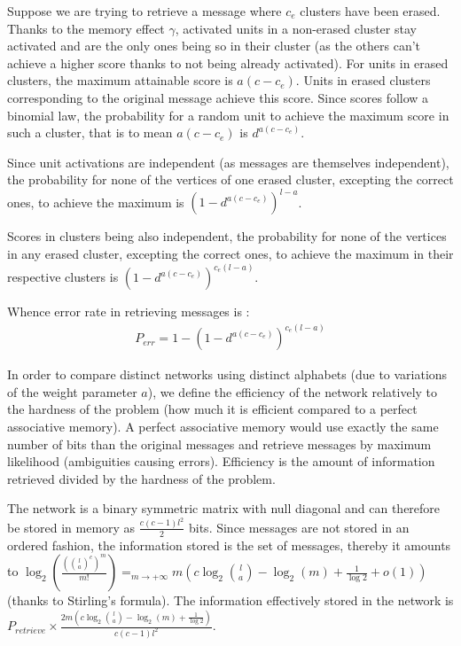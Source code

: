 \documentclass[english,10pt,twocolumn]{IEEEtran}
\theoremstyle{definition}
\begin{document}
	Suppose we are trying to retrieve a message where $c_e$ clusters have been erased. %
	Thanks to the memory effect $\gamma$, activated units in a non-erased cluster stay activated and are the only ones being so in their cluster (as the others can't achieve a higher score thanks to not being already activated). For units in erased clusters, the maximum attainable score is $a(c - c_e)$. Units in erased clusters corresponding to the original message achieve this score. Since scores follow a binomial law, the probability for a random unit to achieve the maximum score in such a cluster, that is to mean $a(c-c_e)$ is $d^{a(c-c_e)}$.
	
	
	Since unit activations are independent (as messages are themselves independent), the probability for none of the vertices of one erased cluster, excepting the correct ones, to achieve the maximum is $\left(1 - d^	{a(c-c_e)}\right)^{l-a}$.
	
	Scores in clusters being also independent, the probability for none of the vertices in any erased cluster, excepting the correct ones, to achieve the maximum in their respective clusters is $\left(1 - d^	{a(c-c_e)}\right)^{c_e(l-a)}$.
	
	Whence error rate in retrieving messages is : 
	\begin{align}	
	P_{err} = 1 -	\left(1 - d^	{a(c-c_e)}\right)^{c_e(l-a)} 
	\end{align}	 
	
	In order to compare distinct networks using distinct alphabets (due to variations of the weight parameter $a$), we define the efficiency of the network relatively to the hardness of the problem (how much it is efficient compared to a perfect associative memory). A perfect associative memory would use exactly the same number of bits than the original messages and retrieve messages by maximum likelihood (ambiguities causing errors). Efficiency is the amount of information retrieved divided by the hardness of the problem.
	
	The network is a binary symmetric matrix with null diagonal and can therefore be stored in memory as $\frac{c(c-1) l^2}{2}$ bits. Since messages are not stored in an ordered fashion, the information stored is the set of messages, thereby it amounts to $\log_2(\frac{({l \choose a}^c)^m}{m!}) \mathop{=}_{m \rightarrow +\infty} m(c \log_2{l \choose a } - \log_2(m) + \frac{1}{\log 2} + o(1)) $ (thanks to  Stirling's formula). The information effectively stored in the network is $P_{retrieve} \times  \frac{2m \left(c \log_2{l \choose a } - \log_2(m) + \frac{1}{\log 2} \right)}{c(c-1)l^2}$.
	
\end{document}
